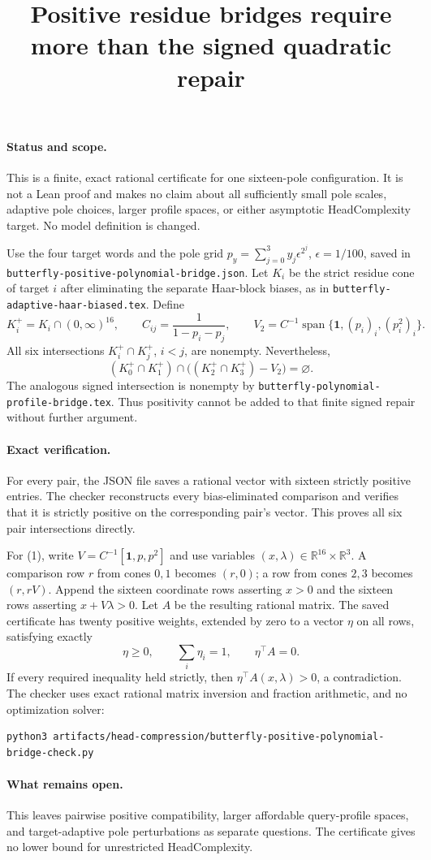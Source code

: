 \documentclass[11pt]{article}
\title{Positive residue bridges require more than the signed quadratic repair}
\author{}\date{}
\begin{document}
\maketitle
\paragraph{Status and scope.}
This is a finite, exact rational certificate for one sixteen-pole configuration.
It is not a Lean proof and makes no claim about all sufficiently small pole
scales, adaptive pole choices, larger profile spaces, or either asymptotic
HeadComplexity target. No model definition is changed.

Use the four target words and the pole grid
$p_y=\sum_{j=0}^3y_j\epsilon^{2^j}$, $\epsilon=1/100$, saved in
\texttt{butterfly-positive-polynomial-bridge.json}. Let $K_i$ be the
strict residue cone of target $i$ after eliminating the separate Haar-block
biases, as in \texttt{butterfly-adaptive-haar-biased.tex}. Define
\[
 K_i^+=K_i\cap(0,\infty)^{16},\qquad
 C_{ij}=\frac1{1-p_i-p_j},\qquad
 V_2=C^{-1}\operatorname{span}\{\mathbf1,(p_i)_i,(p_i^2)_i\}.
\]
All six intersections $K_i^+\cap K_j^+$, $i<j$, are nonempty.
Nevertheless,
\[
 (K_0^+\cap K_1^+)\cap
 \bigl((K_2^+\cap K_3^+)-V_2\bigr)=\varnothing.       \tag{1}
\]
The analogous signed intersection is nonempty by
\texttt{butterfly-polynomial-profile-bridge.tex}. Thus positivity cannot
be added to that finite signed repair without further argument.

\paragraph{Exact verification.}
For every pair, the JSON file saves a rational vector with sixteen strictly
positive entries. The checker reconstructs every bias-eliminated comparison
and verifies that it is strictly positive on the corresponding pair's vector.
This proves all six pair intersections directly.

For (1), write $V=C^{-1}[\mathbf1,p,p^2]$ and use variables
$(x,\lambda)\in\mathbb R^{16}\times\mathbb R^3$. A comparison row $r$
from cones $0,1$ becomes $(r,0)$; a row from cones $2,3$ becomes $(r,rV)$.
Append the sixteen coordinate rows asserting $x>0$ and the sixteen rows
asserting $x+V\lambda>0$. Let $A$ be the resulting rational matrix.
The saved certificate has twenty positive weights, extended by zero to a
vector $\eta$ on all rows, satisfying exactly
\[
 \eta\geq0,\qquad \sum_i\eta_i=1,\qquad \eta^\top A=0.
\]
If every required inequality held strictly, then
$\eta^\top A(x,\lambda)>0$, a contradiction. The checker uses exact
rational matrix inversion and fraction arithmetic, and no optimization solver:
\begin{verbatim}
python3 artifacts/head-compression/butterfly-positive-polynomial-bridge-check.py
\end{verbatim}

\paragraph{What remains open.}
This leaves pairwise positive compatibility, larger affordable query-profile
spaces, and target-adaptive pole perturbations as separate questions. The
certificate gives no lower bound for unrestricted HeadComplexity.
\end{document}
